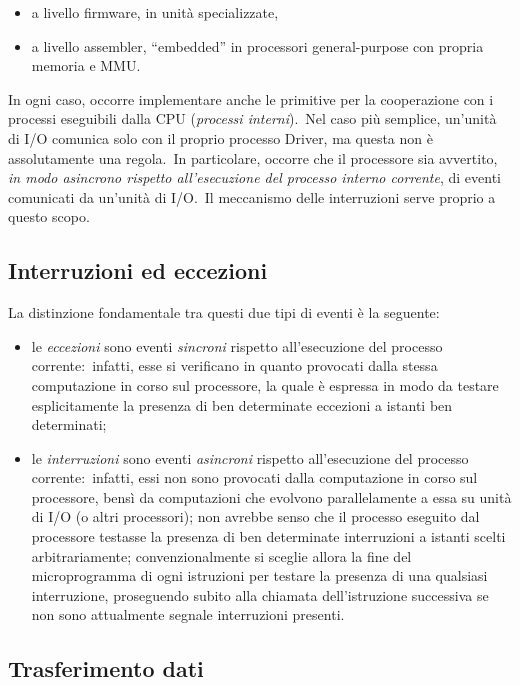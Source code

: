 \begin{itemize}
    \item a livello firmware, in unità specializzate,
    \item a livello assembler, ``embedded'' in processori general-purpose con propria memoria e MMU.
\end{itemize}

\noindent In ogni caso, occorre implementare anche le primitive per la cooperazione con i processi eseguibili dalla CPU (\textit{processi interni}).\
Nel caso più semplice, un'unità di I/O comunica solo con il proprio processo Driver, ma questa non è assolutamente una regola.\
In particolare, occorre che il processore sia avvertito, \textit{in modo asincrono rispetto all'esecuzione del processo interno corrente}, di eventi comunicati da un'unità di I/O.\
Il meccanismo delle interruzioni serve proprio a questo scopo.

\subsection{Interruzioni ed eccezioni}

La distinzione fondamentale tra questi due tipi di eventi è la seguente:

\begin{itemize}
    \item le \textit{eccezioni} sono eventi \textit{sincroni} rispetto all'esecuzione del processo corrente:\ infatti, esse si verificano in quanto provocati dalla stessa computazione in corso sul processore, la quale è espressa in modo da testare esplicitamente la presenza di ben determinate eccezioni a istanti ben determinati;
    \item le \textit{interruzioni} sono eventi \textit{asincroni} rispetto all'esecuzione del processo corrente:\ infatti, essi non sono provocati dalla computazione in corso sul processore, bensì da computazioni che evolvono parallelamente a essa su unità di I/O (o altri processori); non avrebbe senso che il processo eseguito dal processore testasse la presenza di ben determinate interruzioni a istanti scelti arbitrariamente; convenzionalmente si sceglie allora la fine del microprogramma di ogni istruzioni per testare la presenza di una qualsiasi interruzione, proseguendo subito alla chiamata dell'istruzione successiva se non sono attualmente segnale interruzioni presenti.
\end{itemize}

\subsection{Trasferimento dati}

